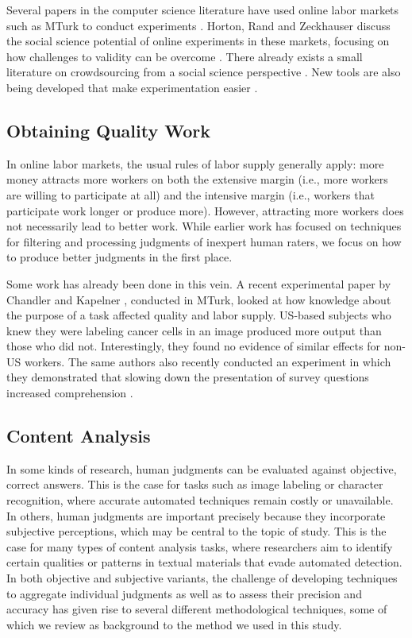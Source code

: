 \documentclass{cscw2010}
\begin{document}
Several papers in the computer science literature have used online
labor markets such as MTurk to conduct experiments
\cite{kittur2008crowdsourcing, snow2008cheap, sheng2008get}. Horton,
Rand and Zeckhauser discuss the social science potential of online
experiments in these markets, focusing on how challenges to validity
can be overcome \cite{hortonZeck2010}. There already exists a small
literature on crowdsourcing from a social science perspective
\cite{huberman-crowdsourcing, mason2009fip, horton2010labor,
  chen2009, chen2010markets}. New tools are also being developed that make
experimentation easier \cite{little-turkit}.

\subsection{Obtaining Quality Work}
In online labor markets, the usual rules of labor supply generally
apply: more money attracts more workers on both the
extensive margin (i.e., more workers are willing to participate at all) and the 
intensive margin (i.e., workers that participate work longer or produce more). However, attracting more workers does
not necessarily lead to better work. While earlier work \cite{von2004labeling, ipeirotis2010, snow2008cheap,
  Hopkins-King2010, downs2010your} has focused on techniques for filtering and
processing judgments of inexpert human raters, we focus
on how to produce better judgments in the first place.

Some work has already been done in this vein. A recent experimental
paper by Chandler and Kapelner \cite{chandler2010}, conducted in
MTurk, looked at how knowledge about the purpose of a task affected
quality and labor supply. US-based subjects who knew they were
labeling cancer cells in an image produced more output than those who did not.
  Interestingly, they found no evidence of similar
effects for non-US workers. The same authors also recently conducted
an experiment in which they demonstrated that slowing down the presentation of 
survey questions increased comprehension \cite{kapelnerpreventing}.

\subsection{Content Analysis}
In some kinds of research, human judgments can be evaluated against
objective, correct answers. This is the case for tasks such as image
labeling or character recognition, where accurate automated techniques
remain costly or unavailable. In others, human judgments are important
precisely because they incorporate subjective perceptions, which may
be central to the topic of study. This is the case for many types of
content analysis tasks, where researchers aim to identify certain
qualities or patterns in textual materials that evade automated
detection. In both objective and subjective variants, the challenge of
developing techniques to aggregate individual judgments as well as to
assess their precision and accuracy has given rise to several
different methodological techniques, some of which we review as
background to the method we used in this study.
\end{document}
